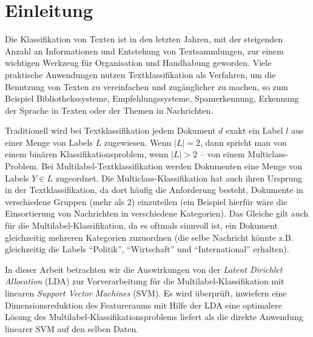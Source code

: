 \section{Einleitung}

\begin{comment}
Einführung und Einbettung des Problems
Was ist die konkrete Problemstellung / Fragestellung der Arbeit
Literature Review
\end{comment}

Die Klassifikation von Texten ist in den letzten Jahren, mit der steigenden Anzahl an Informationen und Entstehung von Textsammlungen, zur einem wichtigen Werkzeug für Organisation und Handhabung geworden.
Viele praktische Anwendungen nutzen Textklassifikation als Verfahren, um die Benutzung von Texten zu vereinfachen und zugänglicher zu machen, so zum Beispiel Bibliothekssysteme, Empfehlungssysteme, Spamerkennung, Erkennung der Sprache in Texten oder der Themen in Nachrichten.

Traditionell wird bei Textklassifikation jedem Dokument $d$ exakt ein Label $l$ aus einer Menge von Labels $L$ zugewiesen.
Wenn $|L| = 2$, dann spricht man von einem binären Klassifikationsproblem, wenn $|L| > 2$ -- von einem Multiclass-Problem.
Bei Multilabel-Textklassifikation werden Dokumenten eine Menge von Labels $Y \in L$ zugeordnet.
Die Multiclass-Klassifikation hat auch ihren Ursprung in der Textklassifikation, da dort häufig die Anforderung besteht, Dokumente in verschiedene Gruppen (mehr als 2) einzuteilen (ein Beispiel hierfür wäre die Einsortierung von Nachrichten in verschiedene Kategorien).
Das Gleiche gilt auch für die Multilabel-Klassifikation, da es oftmals sinnvoll ist, ein Dokument gleichzeitig mehreren Kategorien zuzuordnen (die selbe Nachricht könnte z.B. gleichzeitig die Labels ``Politik'', ``Wirtschaft'' und ``International'' erhalten).

In dieser Arbeit betrachten wir die Auswirkungen von der \emph{Latent Dirichlet Allocation} (LDA) zur Vorverarbeitung für die Multilabel-Klassifikation mit linearen \emph{Support Vector Machines} (SVM).
Es wird überprüft, inwiefern eine Dimensionsreduktion des Featureraums mit Hilfe der LDA eine optimalere Lösung des Multilabel-Klassifikationsproblems liefert als die direkte Anwendung linearer SVM auf den selben Daten.

